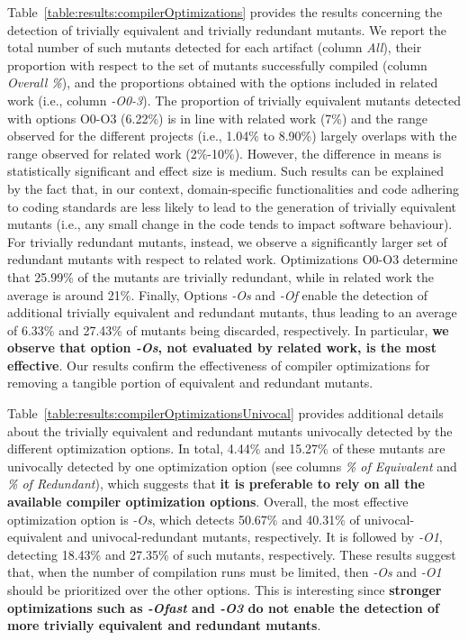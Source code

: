 Table~\ref{table:results:compilerOptimizations} provides the results concerning the detection of trivially equivalent and trivially redundant mutants. We report the total number of such mutants detected for each artifact (column \emph{All}), their proportion with respect to the set of mutants successfully compiled (column \emph{Overall \%}), and the proportions obtained with the options included in related work (i.e., column \emph{-O0-3}). 
 The proportion of trivially equivalent mutants detected with options O0-O3 (6.22\%) is in line with related work (7\%) and the range observed for the different projects (i.e., 1.04\% to 8.90\%) largely overlaps with the range observed for related work (2\%-10\%). However, the difference in means is statistically significant and effect size is medium. Such results can be explained by the fact that, in our context, domain-specific functionalities and code adhering to coding standards are less likely to lead to the generation of trivially equivalent mutants (i.e., any small change in the code tends to impact software behaviour).
 For trivially redundant mutants, instead, we observe a significantly larger set of redundant mutants with respect to related work. Optimizations O0-O3 determine that 25.99\% of the mutants are trivially redundant, while in related work the average is around 21\%. Finally,  
 Options \emph{-Os} and \emph{-Of} enable the detection of additional trivially equivalent and redundant mutants, thus leading to an average of 6.33\% and 27.43\% of mutants being discarded, respectively. In particular, \textbf{we observe that option \emph{-Os}, not evaluated by related work, is the most effective}. Our results confirm the effectiveness of compiler optimizations for removing a tangible portion of equivalent and redundant mutants.
 
Table~\ref{table:results:compilerOptimizationsUnivocal} provides additional details about the trivially equivalent and redundant mutants univocally detected by the different optimization options. In total, 4.44\% and 15.27\% of these mutants are univocally detected  by one optimization option (see columns \emph{\% of Equivalent} and \emph{\% of Redundant}), which suggests that \textbf{it is preferable to rely on all the available compiler optimization options}. Overall, the most effective optimization option is \emph{-Os}, which detects 50.67\% and 40.31\% of univocal-equivalent and univocal-redundant mutants, respectively. It is followed by \emph{-O1}, detecting 18.43\% and 27.35\% of such mutants, respectively. These results suggest that, when the number of compilation runs must be limited, then \emph{-Os} and \emph{-O1} should be prioritized over the other options. This is interesting since \textbf{stronger optimizations such as \emph{-Ofast} and \emph{-O3} do not enable the detection of more trivially equivalent and redundant mutants}.

